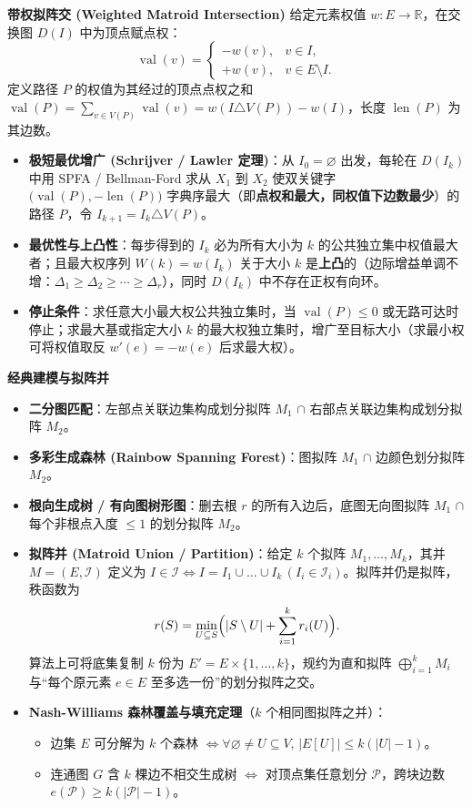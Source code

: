 \textbf{带权拟阵交 (Weighted Matroid Intersection)}
给定元素权值 $w:E\to\mathbb{R}$，在交换图 $D(I)$ 中为顶点赋点权：
\[
\operatorname{val}(v)=
\begin{cases}
-w(v), & v\in I,\\
+w(v), & v\in E\setminus I.
\end{cases}
\]
定义路径 $P$ 的权值为其经过的顶点点权之和 $\operatorname{val}(P)=\sum_{v\in V(P)}\operatorname{val}(v)=w(I\triangle V(P))-w(I)$，长度 $\operatorname{len}(P)$ 为其边数。
\begin{itemize}
    \item \textbf{极短最优增广 (Schrijver / Lawler 定理)}：从 $I_0=\varnothing$ 出发，每轮在 $D(I_k)$ 中用 SPFA / Bellman-Ford 求从 $X_1$ 到 $X_2$ 使双关键字 $\bigl(\operatorname{val}(P),-\operatorname{len}(P)\bigr)$ 字典序最大（即\textbf{点权和最大，同权值下边数最少}）的路径 $P$，令 $I_{k+1}=I_k\triangle V(P)$。
    \item \textbf{最优性与上凸性}：每步得到的 $I_k$ 必为所有大小为 $k$ 的公共独立集中权值最大者；且最大权序列 $W(k)=w(I_k)$ 关于大小 $k$ 是\textbf{上凸}的（边际增益单调不增：$\Delta_1\ge\Delta_2\ge\cdots\ge\Delta_r$），同时 $D(I_k)$ 中不存在正权有向环。
    \item \textbf{停止条件}：求任意大小最大权公共独立集时，当 $\operatorname{val}(P)\le 0$ 或无路可达时停止；求最大基或指定大小 $k$ 的最大权独立集时，增广至目标大小（求最小权可将权值取反 $w'(e)=-w(e)$ 后求最大权）。
\end{itemize}

\textbf{经典建模与拟阵并}
\begin{itemize}
    \item \textbf{二分图匹配}：左部点关联边集构成划分拟阵 $M_1$ $\cap$ 右部点关联边集构成划分拟阵 $M_2$。
    \item \textbf{多彩生成森林 (Rainbow Spanning Forest)}：图拟阵 $M_1$ $\cap$ 边颜色划分拟阵 $M_2$。
    \item \textbf{根向生成树 / 有向图树形图}：删去根 $r$ 的所有入边后，底图无向图拟阵 $M_1$ $\cap$ 每个非根点入度 $\le 1$ 的划分拟阵 $M_2$。
    \item \textbf{拟阵并 (Matroid Union / Partition)}：给定 $k$ 个拟阵 $M_1,\dots,M_k$，其并 $M=(E,\mathcal{I})$ 定义为 $I\in\mathcal{I}\iff I=I_1\cup\dots\cup I_k\,(I_i\in\mathcal{I}_i)$。拟阵并仍是拟阵，秩函数为
    \[
    r(S)=\min_{U\subseteq S}\Bigl(|S\setminus U|+\sum_{i=1}^k r_i(U)\Bigr).
    \]
    算法上可将底集复制 $k$ 份为 $E'=E\times\{1,\dots,k\}$，规约为直和拟阵 $\bigoplus_{i=1}^k M_i$ 与“每个原元素 $e\in E$ 至多选一份”的划分拟阵之交。
    \item \textbf{Nash-Williams 森林覆盖与填充定理}（$k$ 个相同图拟阵之并）：
    \begin{itemize}
        \item 边集 $E$ 可分解为 $k$ 个森林 $\iff \forall \varnothing\neq U\subseteq V,\,|E[U]|\le k(|U|-1)$。
        \item 连通图 $G$ 含 $k$ 棵边不相交生成树 $\iff$ 对顶点集任意划分 $\mathcal{P}$，跨块边数 $e(\mathcal{P})\ge k(|\mathcal{P}|-1)$。
    \end{itemize}
\end{itemize}


